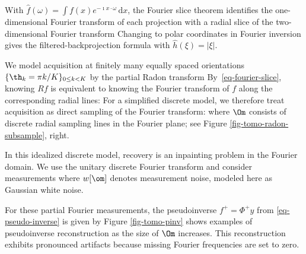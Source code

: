 
With $\hat f(\omega)=\int f(x)e^{-\imath x\cdot\omega}\,\mathrm{d}x$, the Fourier slice theorem identifies the one-dimensional Fourier transform of each projection with a radial slice of the two-dimensional Fourier transform
\eql{\label{eq-fourier-slice}
	\foralls \th \in [0,\pi)~,~ 
\foralls \xi \in \RR\quad
		\hat p_\th(\xi) = \hat f( \xi \cos \th, \xi \sin \th ).
}
Changing to polar coordinates in Fourier inversion gives the filtered-backprojection formula
with $\hat h(\xi) = |\xi|$.




We model acquisition at finitely many equally spaced orientations $\{\th_k=\pi k/K\}_{0\leq k<K}$ by the partial Radon transform
By~\eqref{eq-fourier-slice}, knowing $R f$ is equivalent to knowing the Fourier transform of $f$ along the corresponding radial lines:
For a simplified discrete model, we therefore treat acquisition as direct sampling of the Fourier transform:
where $\Om$ consists of discrete radial sampling lines in the Fourier plane; see Figure \ref{fig-tomo-radon-subsample}, right.

In this idealized discrete model, recovery is an inpainting problem in the Fourier domain. We use the unitary discrete Fourier transform and consider measurements
where $w[\om]$ denotes measurement noise, modeled here as Gaussian white noise.


For these partial Fourier measurements, the pseudoinverse $f^+ = \Phi^+ y$ from \eqref{eq-pseudo-inverse} is given by
Figure \ref{fig-tomo-pinv} shows examples of pseudoinverse reconstruction as the size of $\Om$ increases. This reconstruction exhibits pronounced artifacts because missing Fourier frequencies are set to zero.

